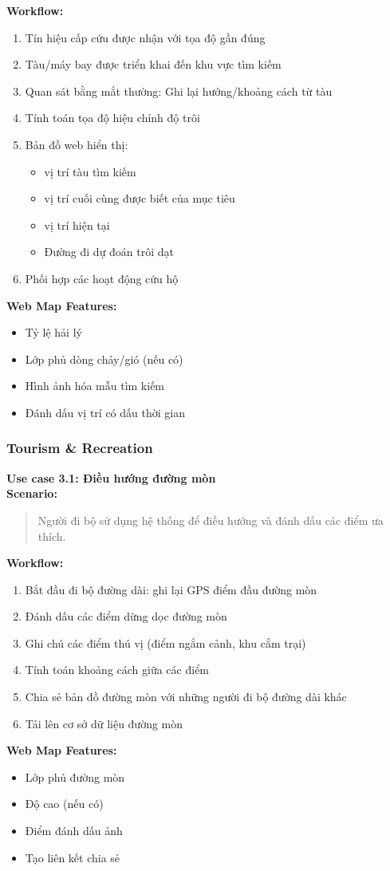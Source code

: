 \begin{itemize}
\textbf{Workflow:}
\begin{enumerate}
    \item Tín hiệu cấp cứu được nhận với tọa độ gần đúng
    \item Tàu/máy bay được triển khai đến khu vực tìm kiếm
    \item Quan sát bằng mắt thường: Ghi lại hướng/khoảng cách từ tàu
    \item Tính toán tọa độ hiệu chỉnh độ trôi
    \item Bản đồ web hiển thị:
    \begin{itemize}
        \item vị trí tàu tìm kiếm
        \item vị trí cuối cùng được biết của mục tiêu
        \item vị trí hiện tại
        \item Đường đi dự đoán trôi dạt
    \end{itemize}
    \item Phối hợp các hoạt động cứu hộ
\end{enumerate}
\textbf{Web Map Features:}
\begin{itemize}[label=\textbullet]
    \item Tỷ lệ hải lý
    \item Lớp phủ dòng chảy/gió (nếu có)
    \item Hình ảnh hóa mẫu tìm kiếm
    \item Đánh dấu vị trí có dấu thời gian
\end{itemize}
\subsubsection{Tourism \& Recreation}
\textbf{Use case 3.1: Điều hướng đường mòn} \\

\textbf{Scenario:}
\begin{quote}
Người đi bộ sử dụng hệ thống để điều hướng và đánh dấu các điểm ưa thích.
\end{quote}

\textbf{Workflow:}
\begin{enumerate}
    \item Bắt đầu đi bộ đường dài: ghi lại GPS điểm đầu đường mòn
    \item Đánh dấu các điểm dừng dọc đường mòn
    \item Ghi chú các điểm thú vị (điểm ngắm cảnh, khu cắm trại)
    \item Tính toán khoảng cách giữa các điểm
    \item Chia sẻ bản đồ đường mòn với những người đi bộ đường dài khác
    \item Tải lên cơ sở dữ liệu đường mòn
\end{enumerate}
\textbf{Web Map Features:}
\begin{itemize}[label=\textbullet]
    \item Lớp phủ đường mòn
    \item Độ cao (nếu có)
    \item Điểm đánh dấu ảnh
    \item Tạo liên kết chia sẻ
\end{itemize}

\end{itemize}
